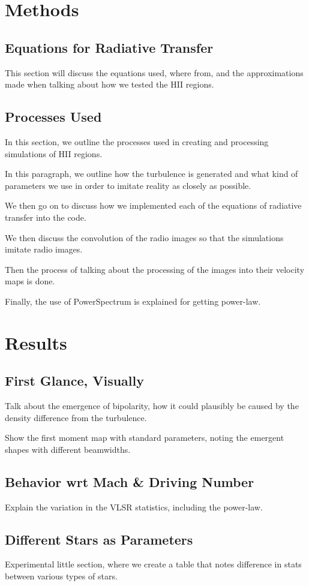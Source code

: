 \documentclass{article}
\begin{document}
\section{Methods}
\subsection{Equations for Radiative Transfer}
This section will discuss the equations used, where from, and the approximations made when talking about how we tested the HII regions.
\subsection{Processes Used}
In this section, we outline the processes used in creating and processing simulations of HII regions.

In this paragraph, we outline how the turbulence is generated and what kind of parameters we use in order to imitate reality as closely as possible.

We then go on to discuss how we implemented each of the equations of radiative transfer into the code.

We then discuss the convolution of the radio images so that the simulations imitate radio images.

Then the process of talking about the processing of the images into their velocity maps is done.

Finally, the use of PowerSpectrum is explained for getting power-law.
\section{Results}
\subsection{First Glance, Visually}
Talk about the emergence of bipolarity, how it could plausibly be caused by the density difference from the turbulence.

Show the first moment map with standard parameters, noting the emergent shapes with different beamwidths.
\subsection{Behavior wrt Mach \& Driving Number}
Explain the variation in the VLSR statistics, including the power-law.
\subsection{Different Stars as Parameters}
Experimental little section, where we create a table that notes difference in stats between various types of stars.
\end{document}
